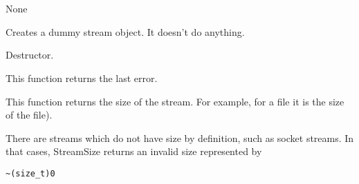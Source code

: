 \section{}\label{wxstreambase}


None







Creates a dummy stream object. It doesn't do anything.



Destructor.

\label{wxstreambaselasterror}


This function returns the last error.
\twocolwidtha{5cm}
\begin{twocollist}\itemsep=0pt
\end{twocollist}


This function returns the size of the stream. For example, for a file it is the size of
the file).


There are streams which do not have size by definition, such as socket streams.
In that cases, StreamSize returns an invalid size represented by
\begin{verbatim}
~(size_t)0
\end{verbatim}

